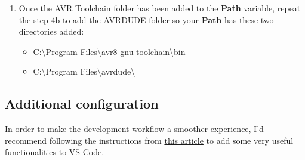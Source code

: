 \documentclass[10pt,letterpaper]{article}
\begin{document}
\begin{enumerate}
\begin{enumerate}
\begin{enumerate}
        \end{enumerate}
    \end{enumerate}
    \item Once the AVR Toolchain folder has been added to the \textbf{Path} variable, repeat the step 4b to add the AVRDUDE folder so your \textbf{Path} has these two directories added:
    \begin{itemize}
        \item {\color{ForestGreen}C:\textbackslash Program Files\textbackslash avr8-gnu-toolchain\textbackslash bin}
        \item {\color{ForestGreen}C:\textbackslash Program Files\textbackslash avrdude\textbackslash}
    \end{itemize}
\end{enumerate}

\subsection{Additional configuration}
In order to make the development workflow a smoother experience, I'd recommend following the instructions from \href{https://www.tonymitchell.ca/posts/use-vscode-with-avr-toolchain/}{this article} to add some very useful functionalities to VS Code.
\end{document}
